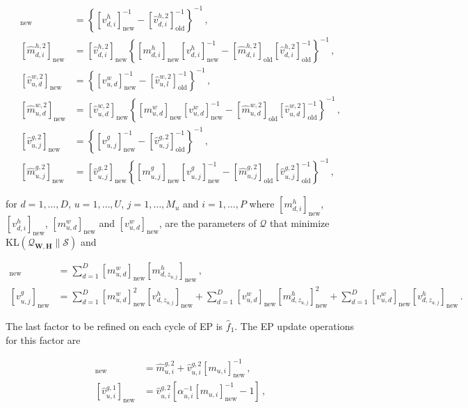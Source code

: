 \documentclass{article}
\begin{document}
\begin{align}
[\hat{v}_{d,i}^{h,2}]_\text{new} & =
\left\{ [v_{d,i}^{h}]_\text{new}^{-1} - [\hat{v}_{d,i}^{h,2} ]_\text{old}^{-1}\right\}^{-1}\,,\\
[\hat{m}_{d,i}^{h,2}]_\text{new} & =
[\hat{v}_{d,i}^{h,2}]_\text{new} \left\{[ m_{d,i}^{h}]_\text{new} 
[v_{d,i}^{h}]_\text{new}^{-1} - [\hat{m}_{d,i}^{h,2}]_\text{old} [\hat{v}_{d,i}^{h,2}]_\text{old}^{-1}\right\}^{-1}\,,\\
[\hat{v}_{u,d}^{w,2}]_\text{new} & =
\left\{ [v_{u,d}^{w}]_\text{new}^{-1} - [\hat{v}_{u,l}^{w,2} ]_\text{old}^{-1}\right\}^{-1}\,,\\
[\hat{m}_{u,d}^{w,2}]_\text{new} & =
[\hat{v}_{u,d}^{w,2}]_\text{new} \left\{[ m_{u,d}^{w}]_\text{new} 
[v_{u,d}^{w}]_\text{new}^{-1} - [\hat{m}_{u,d}^{w,2}]_\text{old} [\hat{v}_{u,d}^{w,2}]_\text{old}^{-1}\right\}^{-1}\,,\\
[\hat{v}_{u,j}^{g,2}]_\text{new} & =
\left\{ [v_{u,j}^{g}]_\text{new}^{-1} - [\hat{v}_{u,j}^{g,2} ]_\text{old}^{-1}\right\}^{-1}\,,\\
[\hat{m}_{u,j}^{g,2}]_\text{new} & =
[\hat{v}_{u,j}^{g,2}]_\text{new} \left\{[ m_{u,j}^{g}]_\text{new} 
[v_{u,j}^{g}]_\text{new}^{-1} - [\hat{m}_{u,j}^{g,2}]_\text{old} [\hat{v}_{u,j}^{g,2}]_\text{old}^{-1}\right\}^{-1}\,,
\end{align}

for $d = 1,\ldots,D$, $u = 1,\ldots,U$, $j = 1,\ldots,M_u$ and $i = 1,\ldots,P$ where $[m_{d,i}^{h}]_\text{new}$,
$[v_{d,i}^{h}]_\text{new}$, $[ m_{u,d}^{w}]_\text{new}$ and $[v_{u,d}^{w}]_\text{new}$, are the parameters of $\mathcal{Q}$ that minimize
$\text{KL}(\mathcal{Q}_{\mathbf{W},\mathbf{H}}\|\mathcal{S})$ and

\begin{align}
[m_{u,j}^{g}]_\text{new} & = \sum_{d=1}^D [m_{u,d}^{w}]_\text{new} [m_{d,z_{u,j}}^{h}]_\text{new}\,,\\
[v_{u,j}^{g}]_\text{new} & = \sum_{d=1}^D [m_{u,d}^{w}]_\text{new}^2 [v_{d,z_{u,j}}^{h}]_\text{new} +
\sum_{d=1}^D [v_{u,d}^{w}]_\text{new} [m_{d,z_{u,j}}^{h}]_\text{new}^2 +
\sum_{d=1}^D [v_{u,d}^{w}]_\text{new} [v_{d,z_{u,j}}^{h}]_\text{new}\,.
\end{align}

The last factor to be refined on each cycle of EP is $\hat{f}_1$. The EP update operations for this factor are

\begin{align}
[\hat{m}_{u,i}^{g,1}]_\text{new} & = \hat{m}_{u,i}^{g,2} + \hat{v}_{u,i}^{g,2}
[m_{u,i}]^{-1}_\text{new}\,,\\
[\hat{v}_{u,i}^{g,1}]_\text{new} & = \hat{v}_{u,i}^{g,2} \left[ \alpha_{u,i}^{-1} [m_{u,i}]^{-1}_\text{new} - 1 \right]\,,
\end{align}
\end{document}
